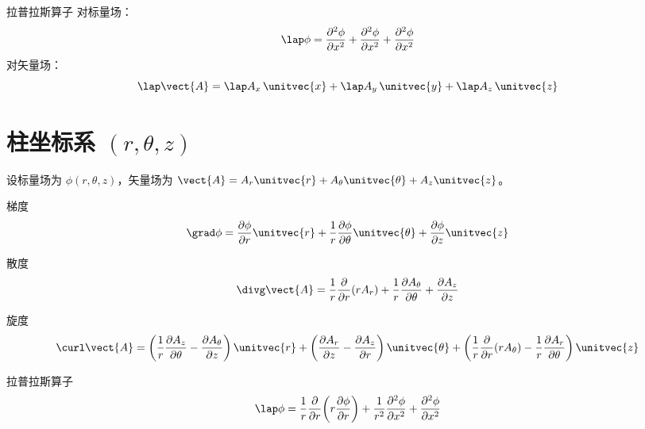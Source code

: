 \begin{definition}{拉普拉斯算子}{}
对标量场：
\begin{equation}
\lap\phi = \frac{\partial^2 \phi}{\partial x^2} + \frac{\partial^2 \phi}{\partial x^2} + \frac{\partial^2 \phi}{\partial x^2}
\end{equation}
对矢量场：
\begin{equation}
\lap\vect{A} = \lap A_x\,\unitvec{x} + \lap A_y\,\unitvec{y} + \lap A_z\,\unitvec{z}
\end{equation}
\end{definition}


\section{柱坐标系 $(r,\theta,z)$}

设标量场为 $\phi(r,\theta,z)$，矢量场为 $\vect{A}=A_r\unitvec{r}+A_\theta\unitvec{\theta}+A_z\unitvec{z}$。

\begin{definition}{梯度}{}
\begin{equation}
\grad\phi = \frac{\partial \phi}{\partial r}\unitvec{r} + \frac{1}{r}\frac{\partial \phi}{\partial \theta}\unitvec{\theta} + \frac{\partial \phi}{\partial z}\unitvec{z}
\end{equation}
\end{definition}

\begin{definition}{散度}{}
\begin{equation}
\divg\vect{A} = \frac{1}{r}\frac{\partial }{\partial r}(rA_r) + \frac{1}{r}\frac{\partial A_\theta}{\partial \theta} + \frac{\partial A_z}{\partial z}
\end{equation}
\end{definition}

\begin{definition}{旋度}{}
\begin{equation}
\curl\vect{A} =
\left(\frac{1}{r}\frac{\partial A_z}{\partial \theta}-\frac{\partial A_\theta}{\partial z}\right)\unitvec{r}
+ \left(\frac{\partial A_r}{\partial z}-\frac{\partial A_z}{\partial r}\right)\unitvec{\theta}
+ \left(\frac{1}{r}\frac{\partial }{\partial r}(rA_\theta)-\frac{1}{r}\frac{\partial A_r}{\partial \theta}\right)\unitvec{z}
\end{equation}
\end{definition}

\begin{definition}{拉普拉斯算子}{}
\begin{equation}
\lap\phi = \frac{1}{r}\frac{\partial }{\partial r}\!\left(r\frac{\partial \phi}{\partial r}\right)
+ \frac{1}{r^2}\frac{\partial^2 \phi}{\partial x^2} + \frac{\partial^2 \phi}{\partial x^2}
\end{equation}
\end{definition}

